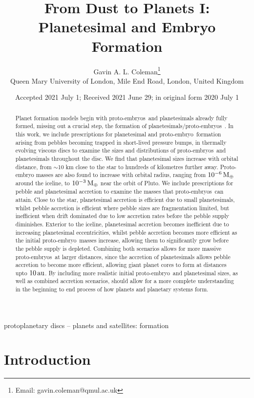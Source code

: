 \documentclass[a4paper,fleqn,usenatbib]{mnras}
\title[Embryo Formation]{From Dust to Planets I: Planetesimal and Embryo Formation}
\author[Coleman, G. A. L]{Gavin A. L. Coleman\thanks{Email: gavin.coleman@qmul.ac.uk}\\
Queen Mary University of London, Mile End Road, London, United Kingdom}
\date{Accepted 2021 July 1; Received 2021 June 29; in original form 2020 July 1}
\newcommand{\me}{{\, {\rm M}_{\oplus}}}
\newcommand{\au}{{\, {\rm au}}}
\newcommand{\emb}{{{proto-embryo~}}}
\newcommand{\embs}{{{proto-embryos~}}}
\begin{document}
\label{firstpage}
\pagerange{\pageref{firstpage}--\pageref{lastpage}}
\maketitle
\begin{abstract}
Planet formation models begin with \embs and planetesimals already fully formed, missing out a crucial step, the formation of planetesimals/\embs.
In this work, we include prescriptions for planetesimal and \emb formation arising from pebbles becoming trapped in short-lived pressure bumps, in thermally evolving viscous discs to examine the sizes and distributions of \embs and planetesimals throughout the disc.
We find that planetesimal sizes increase with orbital distance, from $\sim$10 km close to the star to hundreds of kilometres further away.
Proto-embryo masses are also found to increase with orbital radius, ranging from $10^{-6}\me$ around the iceline, to $10^{-3}\me$ near the orbit of Pluto.
We include prescriptions for pebble and planetesimal accretion to examine the masses that \embs can attain.
Close to the star, planetesimal accretion is efficient due to small planetesimals, whilst pebble accretion is efficient where pebble sizes are fragmentation limited, but inefficient when drift dominated due to low accretion rates before the pebble supply diminishes.
Exterior to the iceline, planetesimal accretion becomes inefficient due to increasing planetesimal eccentricities, whilst pebble accretion becomes more efficient as the initial \emb masses increase, allowing them to significantly grow before the pebble supply is depleted.
Combining both scenarios allows for more massive \embs at larger distances, since the accretion of planetesimals allows pebble accretion to become more efficient, allowing giant planet cores to form at distances upto $10\au$.
By including more realistic initial \emb and planetesimal sizes, as well as combined accretion scenarios, should allow for a more complete understanding in the beginning to end process of how planets and planetary systems form.


\end{abstract}
\begin{keywords}
protoplanetary discs -- planets and satellites: formation
\end{keywords}

\section{Introduction}
\label{sec:intro}
\end{document}
